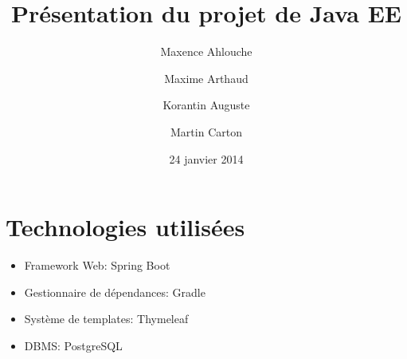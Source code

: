 \documentclass{beamer}
\title{Présentation du projet de Java EE}
\institute{Enseeiht}
\author
  [M.\ Ahlouche \and M.\ Arthaud \and K.\ Auguste \and M.\ Carton]
  {Maxence Ahlouche \and Maxime Arthaud \and Korantin Auguste \and Martin Carton}
\date{24 janvier 2014}
\begin{document}
\begin{frame}
  \titlepage
\end{frame}

\section{Technologies utilisées}
  \begin{frame}
    \begin{itemize}
      \item Framework Web: Spring Boot 
      \item Gestionnaire de dépendances: Gradle 

      \item Système de templates: Thymeleaf 
      \item DBMS: PostgreSQL 

    \end{itemize}
  \end{frame}
\end{document}
